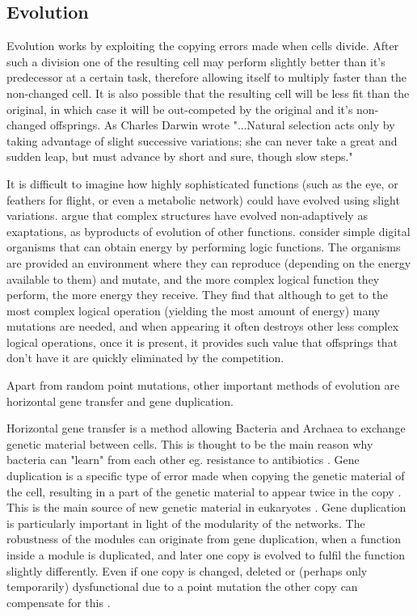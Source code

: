 \documentclass[10pt,a4paper]{article}
\begin{document}
	
	
	\subsection{Evolution}\label{chap:evolution}
	
	Evolution works by exploiting the copying errors made when cells divide. After such a division one of the resulting cell may perform slightly better than it's predecessor at a certain task, therefore allowing itself to multiply faster than the non-changed cell. It is also possible that the resulting cell will be less fit than the original, in which case it will be out-competed by the original and it's non-changed offsprings. As Charles Darwin wrote "...Natural selection acts only by taking advantage of slight successive variations; she can never take a great and sudden leap, but must advance by short and sure, though slow steps." \cite{darwin} 
	
	It is difficult to imagine how highly sophisticated functions (such as the eye, or feathers for flight, or even a metabolic network) could have evolved using slight variations. \citeauthor{latent} argue that complex structures have evolved non-adaptively as exaptations, as byproducts of evolution of other functions. \citeauthor{complexfeatures}  consider simple digital organisms that can obtain energy by performing logic functions. The organisms are provided an environment where they can reproduce (depending on the energy available to them) and mutate, and the more complex logical function they perform, the more energy they receive. They find that although to get to the most complex logical operation (yielding the most amount of energy) many mutations are needed, and when appearing it often destroys other less complex logical operations, once it is present, it provides such value that offsprings that don't have it are quickly eliminated by the competition.
	
	Apart from random point mutations, other important methods of evolution are horizontal gene transfer and gene duplication. 
	
	Horizontal gene transfer is a method allowing Bacteria and Archaea to exchange genetic material between cells. This is thought to be the main reason why bacteria can "learn" from each other eg. resistance to antibiotics \cite{horizontalAntibiotics}\cite{horizontalgenetransfer}. Gene duplication is a specific type of error made when copying the genetic material of the cell, resulting in a part of the genetic material to appear twice in the copy \cite{geneduplication}. This is the main source of new genetic material in eukaryotes \cite{horizontalgenetransfer}. Gene duplication is particularly important in light of the modularity of the networks. The robustness of the modules can originate from gene duplication, when a function inside a module is duplicated, and later one copy is evolved to fulfil the function slightly differently. Even if one copy is changed, deleted or (perhaps only temporarily) dysfunctional due to a point mutation the other copy can compensate for this \cite{duplicaterole} \cite{complexfeatures}. 
	
\end{document}
